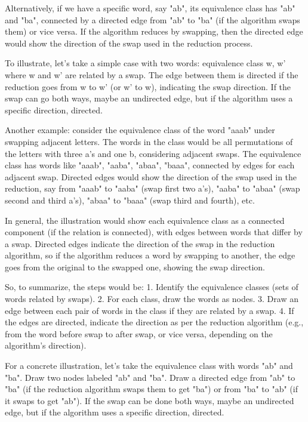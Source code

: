 Alternatively, if we have a specific word, say "ab", its equivalence class has "ab" and "ba", connected by a directed edge from "ab" to "ba" (if the algorithm swaps them) or vice versa. If the algorithm reduces by swapping, then the directed edge would show the direction of the swap used in the reduction process.

To illustrate, let's take a simple case with two words: equivalence class {w, w'} where w and w' are related by a swap. The edge between them is directed if the reduction goes from w to w' (or w' to w), indicating the swap direction. If the swap can go both ways, maybe an undirected edge, but if the algorithm uses a specific direction, directed.

Another example: consider the equivalence class of the word "aaab" under swapping adjacent letters. The words in the class would be all permutations of the letters with three a's and one b, considering adjacent swaps. The equivalence class has words like "aaab", "aaba", "abaa", "baaa", connected by edges for each adjacent swap. Directed edges would show the direction of the swap used in the reduction, say from "aaab" to "aaba" (swap first two a's), "aaba" to "abaa" (swap second and third a's), "abaa" to "baaa" (swap third and fourth), etc.

In general, the illustration would show each equivalence class as a connected component (if the relation is connected), with edges between words that differ by a swap. Directed edges indicate the direction of the swap in the reduction algorithm, so if the algorithm reduces a word by swapping to another, the edge goes from the original to the swapped one, showing the swap direction.

So, to summarize, the steps would be:
1. Identify the equivalence classes (sets of words related by swaps).
2. For each class, draw the words as nodes.
3. Draw an edge between each pair of words in the class if they are related by a swap.
4. If the edges are directed, indicate the direction as per the reduction algorithm (e.g., from the word before swap to after swap, or vice versa, depending on the algorithm's direction).

For a concrete illustration, let's take the equivalence class with words "ab" and "ba". Draw two nodes labeled "ab" and "ba". Draw a directed edge from "ab" to "ba" (if the reduction algorithm swaps them to get "ba") or from "ba" to "ab" (if it swaps to get "ab"). If the swap can be done both ways, maybe an undirected edge, but if the algorithm uses a specific direction, directed.

